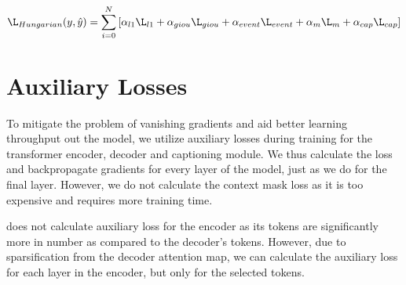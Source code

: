 $$\L_{Hungarian}(y, \hat{y}) = \sum_{i=0}^{N}\left [ \alpha_{l1}\L_{l1} + \alpha_{giou}\L_{giou} + \alpha_{event}\L_{event} + \alpha_{m}\L_{m} + \alpha_{cap}\L_{cap} \right ]$$

\section{Auxiliary Losses}
\par To mitigate the problem of vanishing gradients and aid better learning throughput out the model, we utilize auxiliary losses during training for the transformer encoder, decoder and captioning module. We thus calculate the loss and backpropagate gradients for every layer of the model, just as we do for the final layer. However, we do not calculate the context mask loss as it is too expensive and requires more training time.
\par \cite{detr} does not calculate auxiliary loss for the encoder as its tokens are significantly more in number as compared to the decoder's tokens. However, due to sparsification from the decoder attention map, we can calculate the auxiliary loss for each layer in the encoder, but only for the selected tokens. 




